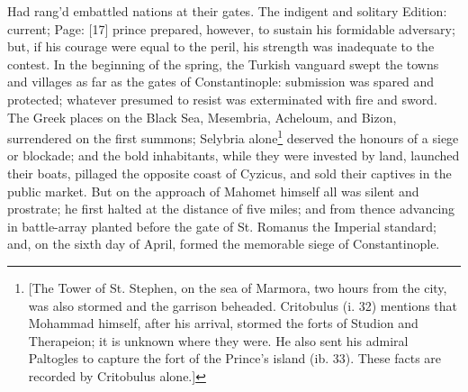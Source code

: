 {Had rang\texthebrew{}’d embattled nations at their gates.} The indigent and solitary Edition: current; Page: [17] prince prepared, however, to sustain his formidable adversary; but, if his courage were equal to the peril, his strength was inadequate to the contest. In the beginning of the spring, the Turkish vanguard swept the towns and villages as far as the gates of Constantinople: submission was spared and protected; whatever presumed to resist was exterminated with fire and sword. The Greek places on the Black Sea, Mesembria, Acheloum, and Bizon, surrendered on the first summons; Selybria alone\footnote{[The Tower of St. Stephen, on the sea of Marmora, two hours from the city, was also stormed and the garrison beheaded. Critobulus (i. 32) mentions that Mohammad himself, after his arrival, stormed the forts of Studion and Therapeion; it is unknown where they were. He also sent his admiral Paltogles to capture the fort of the Prince\texthebrew{}’s island (ib. 33). These facts are recorded by Critobulus alone.]} deserved the honours of a siege or blockade; and the bold inhabitants, while they were invested by land, launched their boats, pillaged the opposite coast of Cyzicus, and sold their captives in the public market. But on the approach of Mahomet himself all was silent and prostrate; he first halted at the distance of five miles; and from thence advancing in battle-array planted before the gate of St. Romanus the Imperial standard; and, on the sixth day of April, formed the memorable siege of Constantinople.


